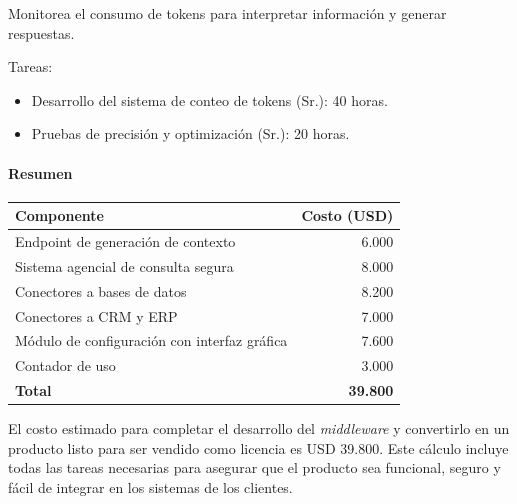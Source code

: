 Monitorea el consumo de tokens para interpretar información y generar respuestas.

Tareas:
\begin{itemize}
    \item Desarrollo del sistema de conteo de tokens (Sr.): 40 horas.
    \item Pruebas de precisión y optimización (Sr.): 20 horas.
\end{itemize}

\paragraph{Resumen}

\begin{center}
\begin{tabular}{lr}
\hline
\textbf{Componente} & \textbf{Costo (USD)} \\
\hline
Endpoint de generación de contexto & 6.000 \\
\hline
Sistema agencial de consulta segura & 8.000 \\
\hline
Conectores a bases de datos & 8.200 \\
\hline
Conectores a CRM y ERP & 7.000 \\
\hline
Módulo de configuración con interfaz gráfica & 7.600 \\
\hline
Contador de uso & 3.000 \\
\hline
\textbf{Total} & \textbf{39.800} \\
\hline
\end{tabular}
\end{center}

El costo estimado para completar el desarrollo del \textit{middleware} y convertirlo en un producto listo para ser vendido como licencia es USD 39.800. Este cálculo incluye todas las tareas necesarias para asegurar que el producto sea funcional, seguro y fácil de integrar en los sistemas de los clientes. 